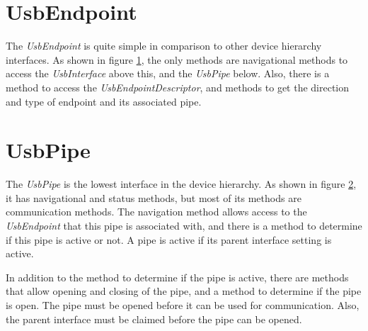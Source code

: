\documentclass{article}
\newcommand{\myinterface}[1]{\emph{#1}}
\newcommand{\mysectionend}[0]{\vfill\pagebreak[1]}
\begin{document}
\mysectionend

%

\section{UsbEndpoint}

The \myinterface{UsbEndpoint} is quite simple in comparison to other device hierarchy
interfaces.  As shown in figure \ref{UsbEndpoint}, the only methods are
navigational methods to access the \myinterface{UsbInterface} above this, and the
\myinterface{UsbPipe} below.  Also, there is a method to access the \myinterface{UsbEndpointDescriptor},
and methods to get the direction and type of endpoint and its associated
pipe.

\begin{figure}
\label{UsbEndpoint}
\end{figure}

\mysectionend

%

\section{UsbPipe}

The \myinterface{UsbPipe} is the lowest interface in the device hierarchy.  As shown in
figure \ref{UsbPipe}, it has navigational and status methods, but most of
its methods are communication methods.  The navigation method allows
access to the \myinterface{UsbEndpoint} that this pipe is associated with, and there
is a method to determine if this pipe is active or not.  A pipe is
active if its parent interface setting is active.

\begin{figure}
\label{UsbPipe}
\end{figure}

In addition to the method to determine if the pipe is active, there
are methods that allow opening and closing of the pipe, and a method
to determine if the pipe is open.  The pipe must be opened before
it can be used for communication.  Also, the parent interface must
be claimed before the pipe can be opened.
\end{document}
